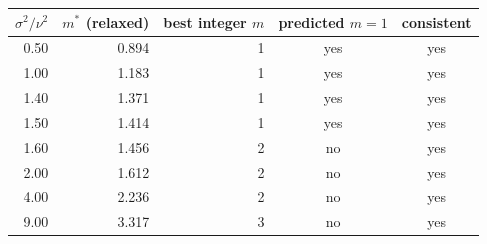 \begin{tabular}{rrrcc}
\toprule
$\sigma^2/\nu^2$ & $m^\ast$ (relaxed) & best integer $m$ & predicted $m{=}1$ & consistent \\
\midrule
0.50 & 0.894 & 1 & yes & yes \\
1.00 & 1.183 & 1 & yes & yes \\
1.40 & 1.371 & 1 & yes & yes \\
1.50 & 1.414 & 1 & yes & yes \\
1.60 & 1.456 & 2 & no & yes \\
2.00 & 1.612 & 2 & no & yes \\
4.00 & 2.236 & 2 & no & yes \\
9.00 & 3.317 & 3 & no & yes \\
\bottomrule
\end{tabular}
